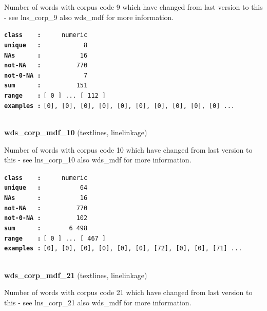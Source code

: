 \documentclass[]{article}
\begin{document}
Number of words with corpus code 9 which have changed from last version
to this - see lns\_corp\_9 also wds\_mdf for more information.

\textbf{\texttt{class\ \ \ \ :}} \texttt{~~~~~numeric}\\
\textbf{\texttt{unique\ \ \ :}} \texttt{~~~~~~~~~~~8}\\
\textbf{\texttt{NAs\ \ \ \ \ \ :}} \texttt{~~~~~~~~~~16}\\
\textbf{\texttt{not-NA\ \ \ :}} \texttt{~~~~~~~~~770}\\
\textbf{\texttt{not-0-NA\ :}} \texttt{~~~~~~~~~~~7}\\
\textbf{\texttt{sum\ \ \ \ \ \ :}} \texttt{~~~~~~~~~151}\\
\textbf{\texttt{range\ \ \ \ :}}
\texttt{{[}\ 0\ {]}\ ...\ {[}\ 112\ {]}}\\
\textbf{\texttt{examples\ :}}
\texttt{{[}0{]},\ {[}0{]},\ {[}0{]},\ {[}0{]},\ {[}0{]},\ {[}0{]},\ {[}0{]},\ {[}0{]},\ {[}0{]},\ {[}0{]}\ ...}\\

~

\textbf{wds\_corp\_mdf\_10} (textlines, linelinkage)

Number of words with corpus code 10 which have changed from last version
to this - see lns\_corp\_10 also wds\_mdf for more information.

\textbf{\texttt{class\ \ \ \ :}} \texttt{~~~~~numeric}\\
\textbf{\texttt{unique\ \ \ :}} \texttt{~~~~~~~~~~64}\\
\textbf{\texttt{NAs\ \ \ \ \ \ :}} \texttt{~~~~~~~~~~16}\\
\textbf{\texttt{not-NA\ \ \ :}} \texttt{~~~~~~~~~770}\\
\textbf{\texttt{not-0-NA\ :}} \texttt{~~~~~~~~~102}\\
\textbf{\texttt{sum\ \ \ \ \ \ :}} \texttt{~~~~~~~6~498}\\
\textbf{\texttt{range\ \ \ \ :}}
\texttt{{[}\ 0\ {]}\ ...\ {[}\ 467\ {]}}\\
\textbf{\texttt{examples\ :}}
\texttt{{[}0{]},\ {[}0{]},\ {[}0{]},\ {[}0{]},\ {[}0{]},\ {[}0{]},\ {[}72{]},\ {[}0{]},\ {[}0{]},\ {[}71{]}\ ...}\\

~

\textbf{wds\_corp\_mdf\_21} (textlines, linelinkage)

Number of words with corpus code 21 which have changed from last version
to this - see lns\_corp\_21 also wds\_mdf for more information.
\end{document}
